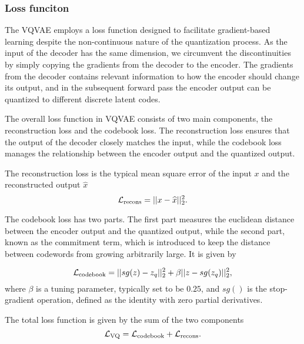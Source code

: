 \documentclass[../../thesis.tex]{subfiles}
\begin{document}
\subsubsection{Loss funciton}
\label{section:VQVAELoss}
The VQVAE employs a loss function designed to facilitate gradient-based learning despite the non-continuous nature of the quantization process. As the input of the decoder has the same dimension, we circumvent the discontinuities by simply copying the gradients from the decoder to the encoder. The gradients from the decoder contains relevant information to how the encoder should change its output, and in the subsequent forward pass the encoder output can be quantized to different discrete latent codes.\newline


The overall loss function in VQVAE consists of two main components, the reconstruction loss and the codebook loss. The reconstruction loss ensures that the output of the decoder closely matches the input, while the codebook loss manages the relationship between the encoder output and the quantized output.\newline

The reconstruction loss is the typical mean square error of the input $x$ and the reconstructed output $\widehat{x}$
\begin{equation}
    \mathcal{L}_{\text{recons}} = ||x - \widehat{x}||_2^2.
\end{equation}

The codebook loss has two parts. The first part measures the euclidean distance between the encoder output and the quantized output, while the second part, known as the commitment term, which is introduced to keep the distance between codewords from growing arbitrarily large. It is given by 

\begin{equation}
    \mathcal{L}_{\text{codebook}} = ||sg(z) - z_q||_2^2 +\beta||z - sg(z_q)||_2^2,
\end{equation}
where $\beta$ is a tuning parameter, typically set to be $0.25$, and $sg()$ is the stop-gradient operation, defined as the identity with zero partial derivatives. \newline

The total loss function is given by the sum of the two components
    \begin{equation}     
        \label{eq:VQVAELoss}
            \mathcal{L}_{\text{VQ}} = \mathcal{L}_{\text{codebook}} + \mathcal{L}_{\text{recons}}.
    \end{equation}
\end{document}
